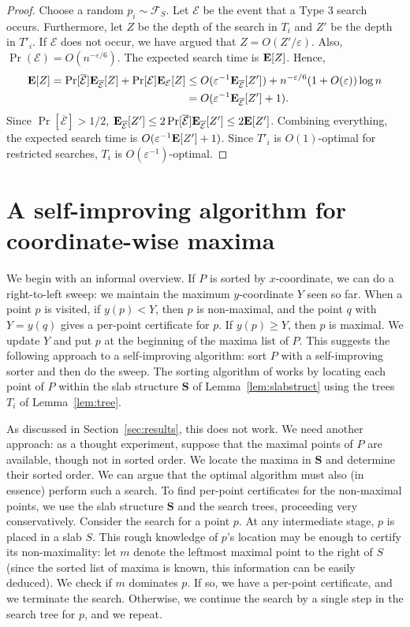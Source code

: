 \documentclass[letterpaper,11pt]{article}
\newcommand{\eps}{\varepsilon}
\newcommand{\EX}{\hbox{\bf E}}
\newcommand{\bS}{\textbf{S}}
\newcommand{\cE}{\mathcal{E}}
\newcommand{\cF}{\mathcal{F}}
\begin{document}
\begin{proof}
Choose a random $p_i \sim \cF_S$.
Let $\cE$ be the event that 
a Type 3 search occurs. Furthermore, 
let $Z$ be the depth of the search 
in $T_i$ and $Z'$ be
the depth in $T'_i$. 
If $\cE$ does not occur, 
we have argued that $Z = O(Z'/\eps)$.
Also, $\Pr(\cE) = O(n^{-\eps/6})$. 
The expected search time is $\EX[Z]$.
Hence,
\begin{align*}
  \EX[Z] =  
    \Pr[\overline{\cE}] \EX_{\overline{\cE}}[Z] + 
    \Pr[\cE]\EX_{\cE}[Z] 
  &\leq  
    O(\eps^{-1}\EX_{\overline{\cE}}[Z']) +  n^{-\eps/6}(1+O(\eps))\log n \\
  &= O(\eps^{-1}\EX_{\overline{\cE}}[Z'] + 1).
\end{align*}	
Since $\Pr[\overline{\cE}] > 1/2$,
$\EX_{\overline{\cE}}[Z'] \leq 
2\Pr[\overline{\cE}] \EX_{\overline{\cE}}[Z'] 
\leq 2\EX[Z']$.
Combining everything, the 
expected search time is 
$O(\eps^{-1}\EX[Z'] + 1)$. 
Since $T'_i$ is $O(1)$-optimal 
for restricted searches, 
$T_i$ is $O(\eps^{-1})$-optimal.
\end{proof}




\section{A self-improving algorithm for coordinate-wise maxima}

We begin with an informal overview.
If $P$ is sorted by $x$-coordinate, we
can do a
right-to-left sweep:
we maintain the maximum $y$-coordinate $Y$ 
seen so far. When a point $p$ is visited,
if $y(p) < Y$, then $p$ is non-maximal, and the point $q$ with
$Y=y(q)$ gives a per-point certificate for $p$.
If $y(p)\ge Y$, then $p$ is maximal. We update $Y$ and put
$p$ at the beginning of the maxima list of $P$.
This suggests the following approach to a 
self-improving algorithm: sort $P$ with a 
self-improving sorter and then do the 
sweep. The sorting algorithm of \cite{AilonCCLMS11} 
works by locating each point of $P$ within 
the slab structure $\bS$ of 
Lemma~\ref{lem:slabstruct} using the trees $T_i$ of
Lemma~\ref{lem:tree}.

As discussed in Section~\ref{sec:results}, 
this does not work. We need another approach:
as a thought experiment, suppose that the maximal
points of $P$ are available, though not in sorted order. 
We locate the maxima in $\bS$ and 
determine their sorted order. 
We can argue that the optimal algorithm must also
(in essence) perform such a search. To find 
per-point certificates for the non-maximal points,
we use the slab structure $\bS$ and the search trees,
proceeding very conservatively.
Consider the search for a point $p$. At any intermediate
stage, $p$ is placed in a slab $S$.
This rough knowledge of $p$'s location 
may be enough to certify 
its non-maximality: 
let $m$ denote the leftmost maximal
point to the right of $S$ (since the 
sorted list of maxima is known, this information
can be easily deduced). We check if $m$ dominates 
$p$. If so, we have a per-point 
certificate, and we terminate the search. 
Otherwise, we continue the search by a single 
step in the search tree for $p$, and we repeat. 
\end{document}

